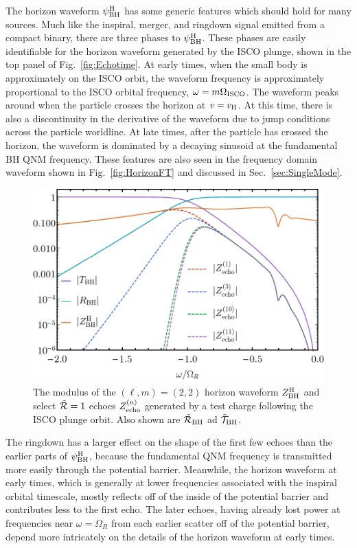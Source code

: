 \begin{refsection}
The horizon waveform $\psi^{\rm H}_{\rm BH}$ has some generic features which should hold for many sources.
Much like the inspiral, merger, and ringdown signal emitted from a compact binary, there are three phases to $\psi^{\rm H}_{\rm BH}$.
These phases are easily identifiable for the horizon waveform generated by the ISCO plunge, shown in the top panel of Fig.~\ref{fig:Echotime}.
At early times, when the small body is approximately on the ISCO orbit, the waveform frequency is approximately proportional to the ISCO orbital frequency, $\omega =m\Omega_{\rm ISCO}$. 
The waveform peaks around when the particle crosses the horizon at $v=v_{\rm H}$. At this time, there is also a discontinuity in the derivative of the waveform due to jump conditions across the particle worldline. 
At late times, after the particle has crossed the horizon, the waveform is dominated by a decaying sinusoid at the fundamental BH QNM frequency. 
These features are also seen in the frequency domain waveform shown in Fig.~\ref{fig:HorizonFT} and discussed in Sec.~\ref{sec:SingleMode}.

\begin{figure}[t]
\includegraphics[width =1 \columnwidth]{chapter_echo/etc/generalechosplot.pdf}
\caption{The modulus of the $(\ell, m) =(2,2)$ horizon waveform $Z_{\rm BH}^{\rm H}$ and select $\tilde{\mathcal R} =1$ echoes $Z_{\rm echo}^{(n)}$ generated by a test charge following the ISCO plunge orbit. Also shown are $\tilde{\mathcal R}_{\rm BH}$ ad $\tilde{\mathcal T}_{\rm BH}$.
}
\label{fig:Genechos}
\end{figure}

The ringdown has a larger effect on the shape of the first few echoes than the earlier parts of $\psi^{\rm H}_{\rm BH}$, because the fundamental QNM frequency is transmitted more easily through the potential barrier.
Meanwhile, the horizon waveform at early times, which is generally at lower frequencies associated with the inspiral orbital timescale, mostly reflects off of the inside of the potential barrier and contributes less to the first echo. The later echoes, having already lost power at frequencies near $\omega =\Omega_R$ from each earlier scatter off of the potential barrier, depend more intricately on the details of the horizon waveform at early times.


\end{refsection}
